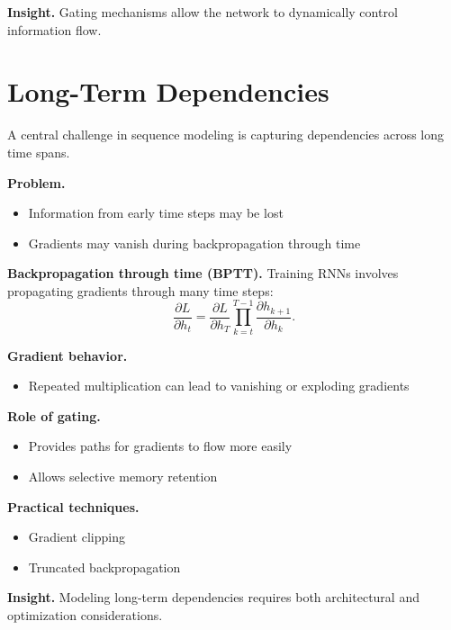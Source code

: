 \noindent
\textbf{Insight.}  
Gating mechanisms allow the network to dynamically control information flow.

\section{Long-Term Dependencies}

A central challenge in sequence modeling is capturing dependencies across long time spans.

\medskip

\noindent
\textbf{Problem.}
\begin{itemize}
    \item Information from early time steps may be lost
    \item Gradients may vanish during backpropagation through time
\end{itemize}

\medskip

\noindent
\textbf{Backpropagation through time (BPTT).}  
Training RNNs involves propagating gradients through many time steps:
\[
\frac{\partial L}{\partial h_t} = \frac{\partial L}{\partial h_T} \prod_{k=t}^{T-1} \frac{\partial h_{k+1}}{\partial h_k}.
\]

\medskip

\noindent
\textbf{Gradient behavior.}
\begin{itemize}
    \item Repeated multiplication can lead to vanishing or exploding gradients
\end{itemize}

\medskip

\noindent
\textbf{Role of gating.}
\begin{itemize}
    \item Provides paths for gradients to flow more easily
    \item Allows selective memory retention
\end{itemize}

\medskip

\noindent
\textbf{Practical techniques.}
\begin{itemize}
    \item Gradient clipping
    \item Truncated backpropagation
\end{itemize}

\medskip

\noindent
\textbf{Insight.}  
Modeling long-term dependencies requires both architectural and optimization considerations.

